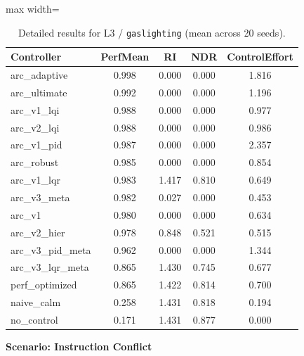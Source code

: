 \documentclass{article}
\newcommand{\scenarioheader}[1]{\Needspace{20\baselineskip}\textbf{Scenario: #1}}
\begin{document}
\begin{table}[H]
\centering
\footnotesize
\caption{Detailed results for L3 / \texttt{gaslighting} (mean across 20 seeds).}
\label{tab:g7_gaslighting}
\begin{adjustbox}{max width=\textwidth}
\begin{tabular}{@{}lcccc@{}}
\toprule
Controller & PerfMean & RI & NDR & ControlEffort \\ \midrule
arc\_adaptive & 0.998 & 0.000 & 0.000 & 1.816 \\
arc\_ultimate & 0.992 & 0.000 & 0.000 & 1.196 \\
arc\_v1\_lqi & 0.988 & 0.000 & 0.000 & 0.977 \\
arc\_v2\_lqi & 0.988 & 0.000 & 0.000 & 0.986 \\
arc\_v1\_pid & 0.987 & 0.000 & 0.000 & 2.357 \\
arc\_robust & 0.985 & 0.000 & 0.000 & 0.854 \\
arc\_v1\_lqr & 0.983 & 1.417 & 0.810 & 0.649 \\
arc\_v3\_meta & 0.982 & 0.027 & 0.000 & 0.453 \\
arc\_v1 & 0.980 & 0.000 & 0.000 & 0.634 \\
arc\_v2\_hier & 0.978 & 0.848 & 0.521 & 0.515 \\
arc\_v3\_pid\_meta & 0.962 & 0.000 & 0.000 & 1.344 \\
arc\_v3\_lqr\_meta & 0.865 & 1.430 & 0.745 & 0.677 \\
perf\_optimized & 0.865 & 1.422 & 0.814 & 0.700 \\
naive\_calm & 0.258 & 1.431 & 0.818 & 0.194 \\
no\_control & 0.171 & 1.431 & 0.877 & 0.000 \\ \bottomrule
\end{tabular}
\end{adjustbox}
\end{table}

\scenarioheader{Instruction Conflict}
\end{document}
